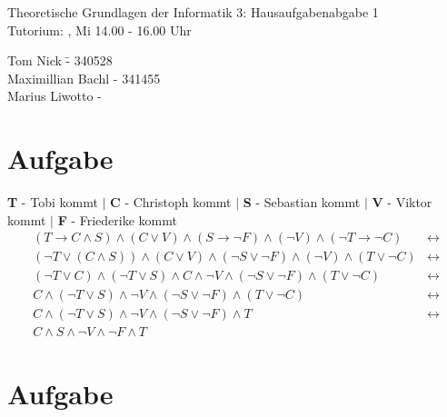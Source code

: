 \documentclass[11pt]{amsart}
\author{}
\begin{document}
\begin{center}
\Large{Theoretische Grundlagen der Informatik 3: Hausaufgabenabgabe 1} \\
\large{Tutorium: , Mi 14.00 - 16.00 Uhr}
\end{center}
\begin{tabbing}
Tom Nick \hspace{2cm}\= - 340528\\
Maximillian Bachl \> - 341455 \\
Marius Liwotto\> -  
\end{tabbing}

\section{Aufgabe}
\textbf{T} - Tobi kommt $\mid$
\textbf{C} - Christoph kommt $\mid$
\textbf{S} - Sebastian kommt $\mid$
\textbf{V} - Viktor kommt $\mid$
\textbf{F} - Friederike kommt
\\

\begin{align*}
(T \to C \land S) \land
(C \lor V) \land
(S \to \lnot F) \land
(\lnot V) \land
(\lnot T \to \lnot C) &\leftrightarrow \\
(\lnot T \lor (C \land S)) \land
(C \lor V) \land
(\lnot S \lor \lnot F) \land
(\lnot V) \land
(T \lor \lnot C) &\leftrightarrow \\
(\lnot T \lor C) \land (\lnot T \lor S) \land
C \land \lnot V \land
(\lnot S \lor \lnot F) \land
(T \lor \lnot C) &\leftrightarrow \\
C \land (\lnot T \lor S) \land
\lnot V \land
(\lnot S \lor \lnot F) \land
(T \lor \lnot C) &\leftrightarrow \\
C \land (\lnot T \lor S) \land
\lnot V \land
(\lnot S \lor \lnot F) \land
T &\leftrightarrow \\
C \land S \land
\lnot V \land
\lnot F \land
T
\end{align*}

\section{Aufgabe}
\end{document}
